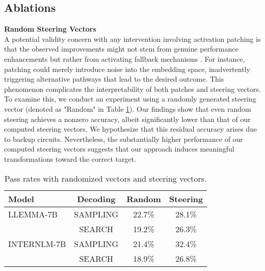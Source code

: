 \subsection{Ablations}
\textbf{Random Steering Vectors}\\
A potential validity concern with any intervention involving activation patching is that the observed improvements might not stem from genuine performance enhancements but rather from activating fallback mechanisms \cite{mcgrath2023hydra, lucchetti2024understandingcodellmsmispredicttypes}. For instance, patching could merely introduce noise into the embedding space, inadvertently triggering alternative pathways that lead to the desired outcome. This phenomenon complicates the interpretability of both patches and steering vectors. To examine this, we conduct an experiment using a randomly generated steering vector (denoted as "Random" in Table \ref{tab:random}). Our findings show that even random steering achieves a nonzero accuracy, albeit significantly lower than that of our computed steering vectors. We hypothesize that this residual accuracy arises due to backup circuits. Nevertheless, the substantially higher performance of our computed steering vectors suggests that our approach induces meaningful transformations toward the correct target.
\begin{table}
\centering
\begin{tabular}{lccc}
\hline
Model & Decoding & Random & Steering \\
\hline
LLEMMA-7B & SAMPLING & 22.7\% & 28.1\% \\
         & SEARCH & 19.2\% & 26.3\% \\
INTERNLM-7B & SAMPLING & 21.4\% & 32.4\% \\
            & SEARCH & 18.9\% & 26.8\% \\
\hline
\end{tabular}
\caption{Pass rates with randomized vectors and steering vectors.}
\label{tab:random}
\end{table}
